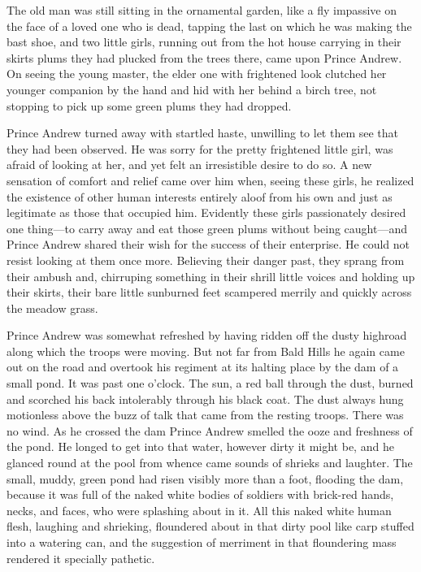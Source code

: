 The old man was still sitting in the ornamental garden, like a
fly impassive on the face of a loved one who is dead, tapping the
last on which he was making the bast shoe, and two little girls,
running out from the hot house carrying in their skirts plums
they had plucked from the trees there, came upon Prince
Andrew. On seeing the young master, the elder one with frightened
look clutched her younger companion by the hand and hid with her
behind a birch tree, not stopping to pick up some green plums
they had dropped.

Prince Andrew turned away with startled haste, unwilling to let
them see that they had been observed. He was sorry for the pretty
frightened little girl, was afraid of looking at her, and yet
felt an irresistible desire to do so. A new sensation of comfort
and relief came over him when, seeing these girls, he realized
the existence of other human interests entirely aloof from his
own and just as legitimate as those that occupied him. Evidently
these girls passionately desired one thing---to carry away and
eat those green plums without being caught---and Prince Andrew
shared their wish for the success of their enterprise. He could
not resist looking at them once more. Believing their danger
past, they sprang from their ambush and, chirruping something in
their shrill little voices and holding up their skirts, their
bare little sunburned feet scampered merrily and quickly across
the meadow grass.

Prince Andrew was somewhat refreshed by having ridden off the
dusty highroad along which the troops were moving. But not far
from Bald Hills he again came out on the road and overtook his
regiment at its halting place by the dam of a small pond. It was
past one o'clock. The sun, a red ball through the dust, burned
and scorched his back intolerably through his black coat. The
dust always hung motionless above the buzz of talk that came from
the resting troops. There was no wind. As he crossed the dam
Prince Andrew smelled the ooze and freshness of the pond. He
longed to get into that water, however dirty it might be, and he
glanced round at the pool from whence came sounds of shrieks and
laughter. The small, muddy, green pond had risen visibly more
than a foot, flooding the dam, because it was full of the naked
white bodies of soldiers with brick-red hands, necks, and faces,
who were splashing about in it. All this naked white human flesh,
laughing and shrieking, floundered about in that dirty pool like
carp stuffed into a watering can, and the suggestion of merriment
in that floundering mass rendered it specially pathetic.

